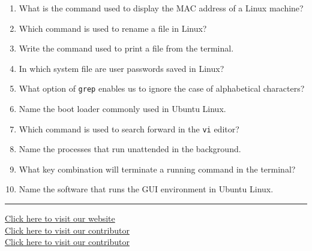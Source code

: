 \documentclass[11pt,a4paper]{article}
\begin{document}
\begin{enumerate}[label=\arabic*.,leftmargin=*,itemsep=6pt]
  \item What is the command used to display the MAC address of a Linux machine?
  \item Which command is used to rename a file in Linux?
  \item Write the command used to print a file from the terminal.
  \item In which system file are user passwords saved in Linux?
  \item What option of   \texttt{grep} enables us to ignore the case of alphabetical characters?
  \item Name the boot loader commonly used in Ubuntu Linux.
  \item Which command is used to search forward in the   \texttt{vi} editor?
  \item Name the processes that run unattended in the background.
  \item What key combination will terminate a running command in the terminal?
  \item Name the software that runs the GUI environment in Ubuntu Linux.
\end{enumerate}

\vfill
\rule{\linewidth}{0.4pt}

\begin{center}\small
\href{https://bhu-exam.vercel.app/}{Click here to visit our website}\\[4pt]\href{https://me-aryan.vercel.app/}{Click here to visit our contributor}\\[4pt]\href{https://quashan-me.vercel.app/}{Click here to visit our contributor}
\end{center}
\end{document}
